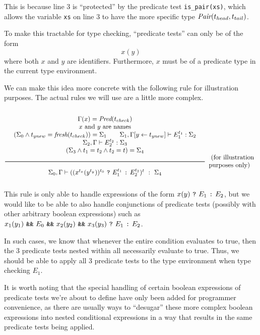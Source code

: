 This is because line 3 is ``protected'' by the predicate test \texttt{is\_pair(xs)},
which allows the variable \texttt{xs} on line 3
to have the more specific type $\textit{Pair}(t_{head}, t_{tail})$.

To make this tractable for type checking,
``predicate tests'' can only be of the form
\[ x(y) \]
where both $x$ and $y$ are identifiers.
Furthermore, $x$ must be of a predicate type in the current type environment.

We can make this idea more concrete with the following rule for illustration purposes.
The actual rules we will use are a little more complex.

\noindent
\[
  \Rule{
  \begin{array}{c}
  \Gamma(x) = \Pred(t_{check})
  \\
  x \text{ and } y \text{ are names}
  \\
  (\Sigma_0 \wedge t_{ynew} = \textit{fresh}(t_{check})) = \Sigma_1 \qquad
  \Sigma_1, \Gamma [ y \leftarrow t_{ynew} ] \vdash E_1^{t_1} : \Sigma_2
  \\
  \Sigma_2, \Gamma \vdash E_2^{t_2} : \Sigma_3
  \\
  (\Sigma_3 \wedge t_1 = t_2 \wedge t_2 = t) = \Sigma_{4}
  \end{array}
  }{
  \Sigma_0, \Gamma \vdash ( (x^{t_x}(y^{t_y}))^{t_0}\ \ThenOp\ E_1^{t_1}\ \ElseOp\ E_2^{t_2})^t\ :\ \Sigma_4}
  \begin{array}{l}
  \text{ (for illustration} \\
  \text{purposes only)}
  \end{array}
\]

This rule is only able to handle expressions of the form
$x(y)\ \texttt{?}\ E_1\ \texttt{:}\ E_2$,
but we would like to be able to also handle
conjunctions of predicate tests
(possibly with other arbitrary boolean expressions)
such as
$x_1(y_1)\ \AndOp\ E_0\ \AndOp\ x_2(y_2)\ \AndOp\ x_3(y_3)\ \ThenOp\ E_1\ \ElseOp\ E_2$.

In such cases, we know that whenever the entire condition evaluates to true,
then the 3 predicate tests nested within all necessarily evaluate to true.
Thus, we should be able to apply all 3 predicate tests to the type environment
when type checking $E_1$.

It is worth noting that the special handling of
certain boolean expressions of predicate tests
we're about to define
have only been added for programmer convenience,
as there are usually ways to ``desugar''
these more complex boolean expressions into nested conditional expressions
in a way that results in the same predicate tests being applied.

